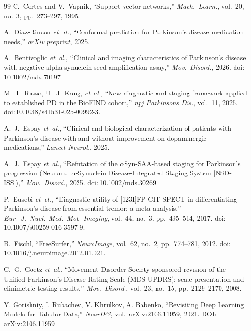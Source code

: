 \begin{thebibliography}{99}
C.~Cortes and V.~Vapnik, ``Support-vector networks,'' \textit{Mach.\ Learn.}, vol.~20, no.~3, pp.~273--297, 1995.

A.~Diaz-Rincon \textit{et~al.}, ``Conformal prediction for Parkinson's disease medication needs,'' \textit{arXiv preprint}, 2025.

A.~Bentivoglio \textit{et~al.}, ``Clinical and imaging characteristics of Parkinson's disease with negative alpha-synuclein seed amplification assay,'' \textit{Mov.\ Disord.}, 2026. doi:\,10.1002/mds.70197.

M.~J.~Russo, U.~J.~Kang, \textit{et~al.}, ``New diagnostic and staging framework applied to established PD in the BioFIND cohort,'' \textit{npj Parkinsons Dis.}, vol.~11, 2025. doi:\,10.1038/s41531-025-00992-3.

A.~J.~Espay \textit{et~al.}, ``Clinical and biological characterization of patients with Parkinson's disease with and without improvement on dopaminergic medications,'' \textit{Lancet Neurol.}, 2025.

A.~J.~Espay \textit{et~al.}, ``Refutation of the $\alpha$Syn-SAA-based staging for Parkinson's progression (Neuronal $\alpha$-Synuclein Disease-Integrated Staging System [NSD-ISS]),'' \textit{Mov.\ Disord.}, 2025. doi:\,10.1002/mds.30269.

P.~Eusebi \textit{et~al.}, ``Diagnostic utility of [123I]FP-CIT SPECT in differentiating Parkinson's disease from essential tremor: a meta-analysis,'' \textit{Eur.\ J.\ Nucl.\ Med.\ Mol.\ Imaging}, vol.~44, no.~3, pp.~495--514, 2017. doi:\,10.1007/s00259-016-3597-9.

B.~Fischl, ``FreeSurfer,'' \textit{NeuroImage}, vol.~62, no.~2, pp.~774--781, 2012. doi:\,10.1016/j.neuroimage.2012.01.021.

C.~G.~Goetz \textit{et~al.}, ``Movement Disorder Society-sponsored revision of the Unified Parkinson's Disease Rating Scale (MDS-UPDRS): scale presentation and clinimetric testing results,'' \textit{Mov.\ Disord.}, vol.~23, no.~15, pp.~2129--2170, 2008.

Y. Gorishniy, I. Rubachev, V. Khrulkov, A. Babenko,
``Revisiting Deep Learning Models for Tabular Data,''
\textit{NeurIPS}, vol.~arXiv:2106.11959, 2021. DOI: \href{https://arxiv.org/abs/2106.11959}{arXiv:2106.11959}


\end{thebibliography}
